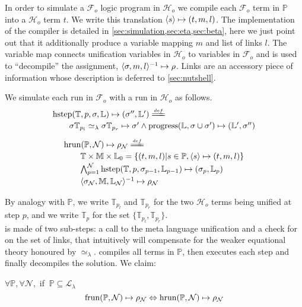 \documentclass[sigconf,natbib=false,review]{acmart}
\newcommand{\UnifRel}{\ensuremath{\simeq}}
\newcommand{\Ue}{\ensuremath{\UnifRel_\lambda}\xspace}
\newcommand{\llambda}{\ensuremath{\mathcal{L}_\lambda}\xspace}
\newcommand{\Fo}{\ensuremath{\mathcal{F}_{\!o}\xspace}} %
\newcommand{\Ho}{\ensuremath{\mathcal{H}_o}\xspace}
\newcommand{\linkStore}{\ensuremath{\mathbb{L}}\xspace}
\newcommand{\mapStore}{\ensuremath{\mathbb{M}}\xspace}
\newcommand{\foUnifPb}{\ensuremath{\mathbb{P}}\xspace}
\newcommand{\hoUnifPb}{\ensuremath{\mathbb{T}}\xspace}
\begin{document}
\noindent
{} 
In order to simulate a \Fo{} logic program in \Ho{} we compile
each \Fo{} term in \foUnifPb into a \Ho{} term $t$.
We write this translation $\langle s \rangle\mapsto(t,m,l)$. The implementation of the compiler
is detailed in \cref{sec:simulation,sec:eta,sec:beta}, here we just point
out that it additionally produce a variable mapping $m$ and list of links $l$.
The variable map connects unification variables in \Ho to variables
in \Fo{} and is used to ``decompile'' the assignment,
$\langle \sigma,m,l \rangle^{-1}\mapsto \rho$. Links are an accessory piece of information whose
description is deferred to \cref{sec:nutshell}.

We simulate each run in \Fo{} with a run in \Ho as follows.
$$
\begin{array}{l}
\stepH{\hoUnifPb}{p}{\sigma}{\linkStore}{\sigma''}{\linkStore'} \deff\vspace{2pt}\\
  \qquad\stepHD{\hoUnifPb}{p}{\sigma}{\sigma'}{\sigma''}{\linkStore}\vspace{2pt}\\
\end{array}
$$
$$
\begin{array}{l}
  \runH{\foUnifPb}{\mathcal{N}}{\rho} \deff \vspace{2pt}\\
  \qquad \hoUnifPb \times \mapStore \times \linkStore_0 = \{ (t,m,l) | s \in \foUnifPb, \C{s}{t}{m}{l} \}\vspace{2pt}\\
  \qquad \runHD{\hoUnifPb}{\mathcal{N}}{\linkStore}\vspace{2pt}\\
  \qquad \D{\sigma_{\mathcal{N}}}{\mapStore}{\linkStore_{\mathcal{N}}}{\rho_{\mathcal{N}}}
\end{array}
$$

\noindent
By analogy with \foUnifPb, we write $\hoUnifPb_{p_l}$ and $\hoUnifPb_{p_r}$
for the two \Ho{} terms being unified at step $p$, and we write $\hoUnifPb_p$
for the set $\{ \hoUnifPb_{p_l}, \hoUnifPb_{p_r} \}$.\\
\hstep{} is made of two sub-steps: a call to the meta language
unification and a check for \progress{} on the set of links, that intuitively
will compensate for the weaker equational theory honoured by \Ue.
\hrun{} compiles all terms in \foUnifPb{}, then executes each step and
finally decompiles the solution.
We claim:

\begin{proposition}[Simulation]\label{prop:simulation}
$\forall \foUnifPb, \forall \mathcal{N},$ if $~\foUnifPb \subseteq \llambda$
$$
  \runF{\foUnifPb}{\mathcal{N}}{\rho}
  \Leftrightarrow
  \runH{\foUnifPb}{\mathcal{N}}{\rho}
$$
\end{proposition}
\end{document}
